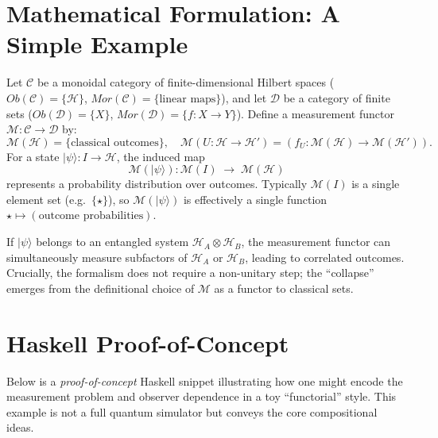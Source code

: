 \documentclass[12pt]{article}
\begin{document}
\section{Mathematical Formulation: A Simple Example}
\label{sec:mathFormulation}

Let \(\mathcal{C}\) be a monoidal category of finite-dimensional Hilbert spaces (\(Ob(\mathcal{C}) = \{ \mathcal{H} \}\), 
\(Mor(\mathcal{C}) = \{ \text{linear maps}\}\)), and let \(\mathcal{D}\) be a category of finite sets 
(\(Ob(\mathcal{D}) = \{ X \}\), \(Mor(\mathcal{D}) = \{ f: X \to Y \}\)). 
Define a measurement functor \(\mathcal{M}: \mathcal{C} \to \mathcal{D}\) by:
\[
\mathcal{M}(\mathcal{H}) = \{\text{classical outcomes}\}, 
\quad \mathcal{M}(U: \mathcal{H} \to \mathcal{H}') 
= (f_U : \mathcal{M}(\mathcal{H}) \to \mathcal{M}(\mathcal{H}')).
\]
For a state \(\vert \psi \rangle: I \to \mathcal{H}\), the induced map
\[
\mathcal{M}(\vert \psi \rangle) : \mathcal{M}(I) \;\to\; \mathcal{M}(\mathcal{H})
\]
represents a probability distribution over outcomes. Typically \(\mathcal{M}(I)\) is a single element set 
(e.g.\ \(\{\star\}\)), so \(\mathcal{M}(\vert \psi \rangle)\) is effectively a single function \(\star \mapsto (\text{outcome probabilities})\).

If \(\vert \psi \rangle\) belongs to an entangled system \(\mathcal{H}_A \otimes \mathcal{H}_B\), 
the measurement functor can simultaneously measure subfactors of \(\mathcal{H}_A\) or \(\mathcal{H}_B\), 
leading to correlated outcomes. Crucially, the formalism does not require a non-unitary step; 
the “collapse” emerges from the definitional choice of \(\mathcal{M}\) as a functor to classical sets.

\vspace{1em}

\section{Haskell Proof-of-Concept}
\label{sec:haskell}

Below is a \emph{proof-of-concept} Haskell snippet illustrating how one might encode the measurement problem 
and observer dependence in a toy ``functorial'' style. This example is not a full quantum simulator 
but conveys the core compositional ideas.
\end{document}
